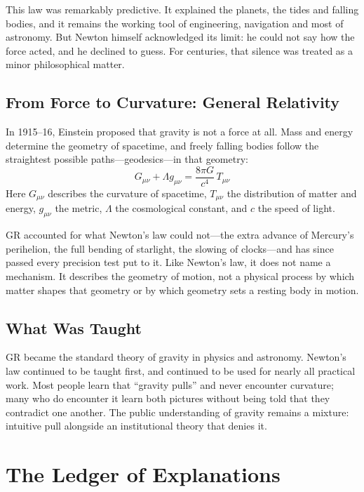 \documentclass[11pt,a4paper]{article}
\begin{document}
This law was remarkably predictive. It explained the planets, the tides and falling bodies, and it remains the working tool of engineering, navigation and most of astronomy. But Newton himself acknowledged its limit: he could not say how the force acted, and he declined to guess. For centuries, that silence was treated as a minor philosophical matter.

\subsection{From Force to Curvature: General Relativity}

In 1915--16, Einstein proposed that gravity is not a force at all. Mass and energy determine the geometry of spacetime, and freely falling bodies follow the straightest possible paths---geodesics---in that geometry:
\begin{equation}
G_{\mu\nu} + \Lambda g_{\mu\nu} = \frac{8\pi G}{c^4}\,T_{\mu\nu}
\end{equation}
Here $G_{\mu\nu}$ describes the curvature of spacetime, $T_{\mu\nu}$ the distribution of matter and energy, $g_{\mu\nu}$ the metric, $\Lambda$ the cosmological constant, and $c$ the speed of light.

GR accounted for what Newton's law could not---the extra advance of Mercury's perihelion, the full bending of starlight, the slowing of clocks---and has since passed every precision test put to it. Like Newton's law, it does not name a mechanism. It describes the geometry of motion, not a physical process by which matter shapes that geometry or by which geometry sets a resting body in motion.

\subsection{What Was Taught}

GR became the standard theory of gravity in physics and astronomy. Newton's law continued to be taught first, and continued to be used for nearly all practical work. Most people learn that ``gravity pulls'' and never encounter curvature; many who do encounter it learn both pictures without being told that they contradict one another. The public understanding of gravity remains a mixture: intuitive pull alongside an institutional theory that denies it.

\section{The Ledger of Explanations}
\end{document}
